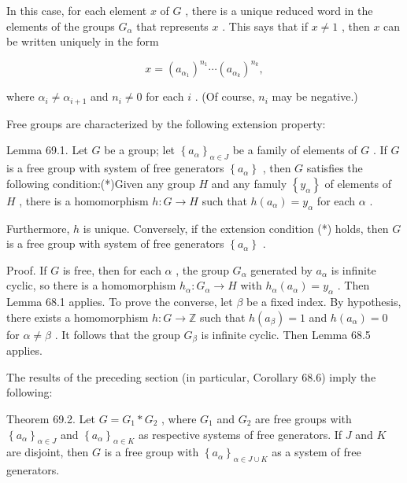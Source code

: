\documentclass[10pt]{article}
\begin{document}
In this case, for each element \(x\) of \(G\) , there is a unique reduced word in the elements of the groups \({G}_{\alpha }\) that represents \(x\) . This says that if \(x \neq  1\) , then \(x\) can be written uniquely in the form

\[
x = {\left( {a}_{{\alpha }_{1}}\right) }^{{n}_{1}}\cdots {\left( {a}_{{\alpha }_{k}}\right) }^{{n}_{k}},
\]

where \({\alpha }_{i} \neq  {\alpha }_{i + 1}\) and \({n}_{i} \neq  0\) for each \(i\) . (Of course, \({n}_{i}\) may be negative.)

Free groups are characterized by the following extension property:

Lemma 69.1. Let \(G\) be a group; let \({\left\{  {a}_{\alpha }\right\}  }_{\alpha  \in  J}\) be a family of elements of \(G\) . If \(G\) is a free group with system of free generators \(\left\{  {a}_{\alpha }\right\}\) , then \(G\) satisfies the following condition:(*)Given any group \(H\) and any famuly \(\left\{  {y}_{\alpha }\right\}\) of elements of \(H\) , there is a homomorphism \(h : G \rightarrow  H\) such that \(h\left( {a}_{\alpha }\right)  = {y}_{\alpha }\) for each \(\alpha\) .

Furthermore, \(h\) is unique. Conversely, if the extension condition (*) holds, then \(G\) is a free group with system of free generators \(\left\{  {a}_{\alpha }\right\}\) .

Proof. If \(G\) is free, then for each \(\alpha\) , the group \({G}_{\alpha }\) generated by \({a}_{\alpha }\) is infinite cyclic, so there is a homomorphism \({h}_{\alpha } : {G}_{\alpha } \rightarrow  H\) with \({h}_{\alpha }\left( {a}_{\alpha }\right)  = {y}_{\alpha }\) . Then Lemma 68.1 applies. To prove the converse, let \(\beta\) be a fixed index. By hypothesis, there exists a homomorphism \(h : G \rightarrow  \mathbb{Z}\) such that \(h\left( {a}_{\beta }\right)  = 1\) and \(h\left( {a}_{\alpha }\right)  = 0\) for \(\alpha  \neq  \beta\) . It follows that the group \({G}_{\beta }\) is infinite cyclic. Then Lemma 68.5 applies.

The results of the preceding section (in particular, Corollary 68.6) imply the following:

Theorem 69.2. Let \(G = {G}_{1} * {G}_{2}\) , where \({G}_{1}\) and \({G}_{2}\) are free groups with \({\left\{  {a}_{\alpha }\right\}  }_{\alpha  \in  J}\) and \({\left\{  {a}_{\alpha }\right\}  }_{\alpha  \in  K}\) as respective systems of free generators. If \(J\) and \(K\) are disjoint, then \(G\) is a free group with \({\left\{  {a}_{\alpha }\right\}  }_{\alpha  \in  J \cup  K}\) as a system of free generators.
\end{document}
